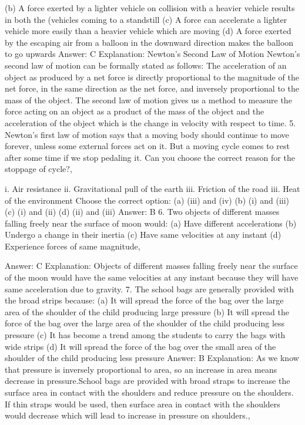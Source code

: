 (b) A force exerted by a lighter vehicle on collision with a heavier
vehicle results in both the (vehicles coming to a standstill
(c) A force can accelerate a lighter vehicle more easily than a
heavier vehicle which are moving
(d) A force exerted by the escaping air from a balloon in the
downward direction makes the balloon to go upwards
Answer: C
Explanation: Newton’s Second Law of Motion
Newton’s second law of motion can be formally stated as follows:
The acceleration of an object as produced by a net force is directly
proportional to the magnitude of the net force, in the same
direction as the net force, and inversely proportional to the mass of
the object.
The second law of motion gives us a method to measure the force
acting on an object as a product of the mass of the object and the
acceleration of the object which is the change in velocity with
respect to time.
5. Newton’s first law of motion says that a moving body should
continue to move forever, unless some external forces act on it.
But a moving cycle comes to rest after some time if we stop
pedaling it. Can you choose the correct reason for the stoppage
of cycle?, 


i. Air resistance
ii. Gravitational pull of the earth
iii. Friction of the road
iii. Heat of the environment
Choose the correct option:
(a) (iii) and (iv)
(b) (i) and (iii)
(c) (i) and (ii)
(d) (ii) and (iii)
Answer: B
6. Two objects of different masses falling freely near the
surface of moon would:
(a) Have different accelerations
(b) Undergo a change in their inertia
(c) Have same velocities at any instant
(d) Experience forces of same magnitude, 


Answer: C
Explanation: Objects of different masses falling freely near the
surface of the moon would have the same velocities at any instant
because they will have same acceleration due to gravity.
7. The school bags are generally provided with the broad strips
because:
(a) It will spread the force of the bag over the large area of the
shoulder of the child producing large pressure
(b) It will spread the force of the bag over the large area of the
shoulder of the child producing less pressure
(c) It has become a trend among the students to carry the bags with
wide strips
(d) It will spread the force of the bag over the small area of the
shoulder of the child producing less pressure
Answer: B
Explanation: As we know that pressure is inversely proportional to
area, so an increase in area means decrease in pressure.School bags
are provided with broad straps to increase the surface area in
contact with the shoulders and reduce pressure on the shoulders. If
thin straps would be used, then surface area in contact with the
shoulders would decrease which will lead to increase in pressure on
shoulders., 


